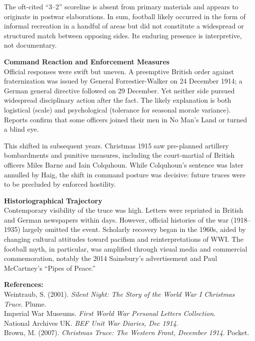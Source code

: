 \begin{technical}
The oft-cited “3–2” scoreline is absent from primary materials and appears to originate in postwar elaborations. In sum, football likely occurred in the form of informal recreation in a handful of areas but did not constitute a widespread or structured match between opposing sides. Its enduring presence is interpretive, not documentary.

\noindent\textbf{Command Reaction and Enforcement Measures}\\[0.5em]
Official responses were swift but uneven. A preemptive British order against fraternization was issued by General Forrestier-Walker on 24 December 1914; a German general directive followed on 29 December. Yet neither side pursued widespread disciplinary action after the fact. The likely explanation is both logistical (scale) and psychological (tolerance for seasonal morale variance). Reports confirm that some officers joined their men in No Man’s Land or turned a blind eye.

This shifted in subsequent years. Christmas 1915 saw pre-planned artillery bombardments and punitive measures, including the court-martial of British officers Miles Barne and Iain Colquhoun. While Colquhoun’s sentence was later annulled by Haig, the shift in command posture was decisive: future truces were to be precluded by enforced hostility.

\noindent\textbf{Historiographical Trajectory}\\[0.5em]
Contemporary visibility of the truce was high. Letters were reprinted in British and German newspapers within days. However, official histories of the war (1918–1935) largely omitted the event. Scholarly recovery began in the 1960s, aided by changing cultural attitudes toward pacifism and reinterpretations of WWI. The football myth, in particular, was amplified through visual media and commercial commemoration, notably the 2014 Sainsbury’s advertisement and Paul McCartney’s “Pipes of Peace.”

\vspace{0.5em}
\noindent\textbf{References:}\\
Weintraub, S. (2001). \textit{Silent Night: The Story of the World War I Christmas Truce}. Plume.\\
Imperial War Museums. \textit{First World War Personal Letters Collection}.\\
National Archives UK. \textit{BEF Unit War Diaries, Dec 1914}.\\
Brown, M. (2007). \textit{Christmas Truce: The Western Front, December 1914}. Pocket.
\end{technical}
